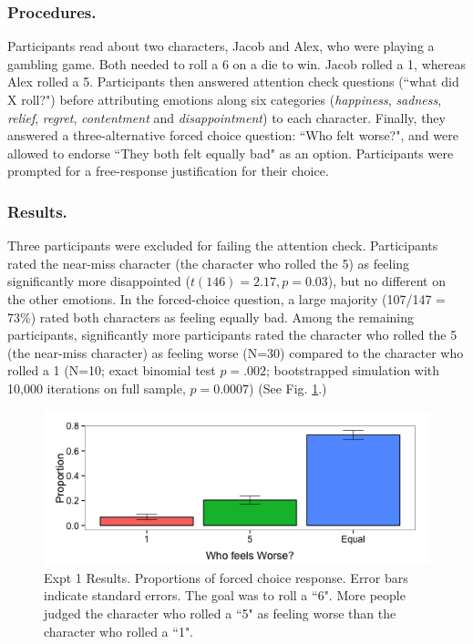 \documentclass[10pt,letterpaper]{article}
\begin{document}
\subsubsection{Procedures.} Participants read about two characters, Jacob and Alex, who were playing a gambling game. Both needed to roll a 6 on a die to win. Jacob rolled a 1, whereas Alex rolled a 5. Participants then answered attention check questions (``what did X roll?") before attributing emotions along six categories (\textit{happiness}, \textit{sadness}, \textit{relief}, \textit{regret}, \textit{contentment} and \textit{disappointment})  to each character. Finally, they answered a three-alternative forced choice question: ``Who felt worse?", and were allowed to endorse ``They both felt equally bad" as an option. Participants were prompted for a free-response justification for their choice.

\subsubsection{Results.} Three participants were excluded for failing the attention check. Participants rated the near-miss character (the character who rolled the 5) as feeling significantly more disappointed ($t(146)=2.17, p=0.03$), but no different on the other emotions. In the forced-choice question, a large majority (107/147 = 73\%) rated both characters as feeling equally bad. Among the remaining participants, significantly more participants rated the character who rolled the 5 (the near-miss character) as feeling worse (N=30) compared to the character who rolled a 1 (N=10; exact binomial test $p=.002$; bootstrapped simulation with 10,000 iterations on full sample, $p=0.0007$) (See Fig. \ref{Expt1ResultFig}.)

\begin{figure}[htb!]
\begin{center}\includegraphics[width=\columnwidth]{images/Expt1results.png}\end{center}
\caption{ Expt 1 Results. Proportions of forced choice response. Error bars indicate standard errors. The goal was to roll a ``6". More people judged the character who rolled a ``5" as feeling worse than the character who rolled a ``1".}
\label{Expt1ResultFig}
\end{figure}
\end{document}
